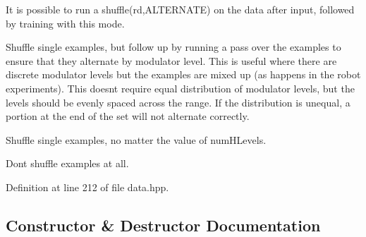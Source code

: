 \begin{Desc}
\begin{description}
It is possible to run a shuffle(rd,\+A\+L\+T\+E\+R\+N\+A\+T\+E) on the data after input, followed by training with this mode. \item[{\em 
A\+L\+T\+E\+R\+N\+A\+TE\hypertarget{classExampleSet_afcdcdbc9a02c53864997e334d8bae33dacc61e53a68e337018a03252922ebc6b1}{}\label{classExampleSet_afcdcdbc9a02c53864997e334d8bae33dacc61e53a68e337018a03252922ebc6b1}
}]Shuffle single examples, but follow up by running a pass over the examples to ensure that they alternate by modulator level. This is useful where there are discrete modulator levels but the examples are mixed up (as happens in the robot experiments). This doesn\textquotesingle{}t require equal distribution of modulator levels, but the levels should be evenly spaced across the range. If the distribution is unequal, a portion at the end of the set will not alternate correctly. \item[{\em 
S\+I\+N\+G\+LE\hypertarget{classExampleSet_afcdcdbc9a02c53864997e334d8bae33dab2b8cedf3f694baf320ce881237c7833}{}\label{classExampleSet_afcdcdbc9a02c53864997e334d8bae33dab2b8cedf3f694baf320ce881237c7833}
}]Shuffle single examples, no matter the value of num\+H\+Levels. \item[{\em 
N\+O\+NE\hypertarget{classExampleSet_afcdcdbc9a02c53864997e334d8bae33dad0bd9d15e4bf63f5038da60af9c4ae07}{}\label{classExampleSet_afcdcdbc9a02c53864997e334d8bae33dad0bd9d15e4bf63f5038da60af9c4ae07}
}]Don\textquotesingle{}t shuffle examples at all. \end{description}
\end{Desc}


Definition at line 212 of file data.\+hpp.



\subsection{Constructor \& Destructor Documentation}
